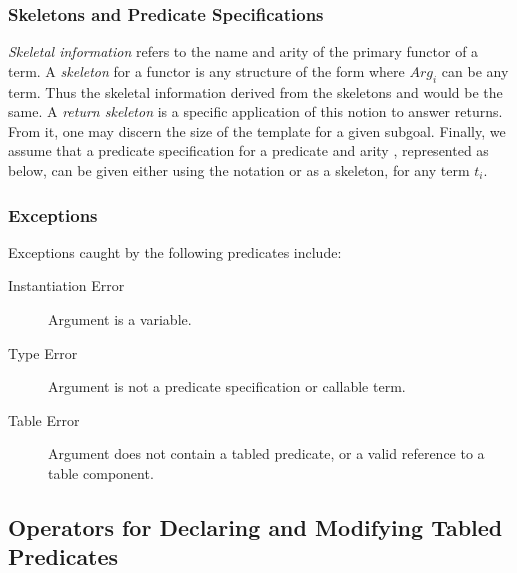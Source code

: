 
\subsubsection*{Skeletons and Predicate Specifications}

\emph{Skeletal information} refers to the name and arity of the
primary functor of a term.  A \emph{skeleton} for a functor 
is any structure of the form  where
$Arg_i$ can be any term.  Thus the skeletal information derived from
the skeletons  and  would be the same.  A
\emph{return skeleton} is a specific application of this notion to
answer returns.  From it, one may discern the size of the template for
a given subgoal.  Finally, we assume that a predicate specification
for a predicate  and arity , represented as
 below, can be given either using the notation
 or as a skeleton,  for any term
$t_i$.


\subsubsection*{Exceptions}

Exceptions caught by the following predicates include:
\begin{description}
\item[Instantiation Error] Argument is a variable.
\item[Type Error] Argument is not a predicate specification or callable term.
\item[Table Error] Argument does not contain a tabled predicate, or a valid
        reference to a table component.
\end{description}



\subsection{Operators for Declaring and Modifying Tabled Predicates}
\label{sec:TablePred:Decl&Mod}

